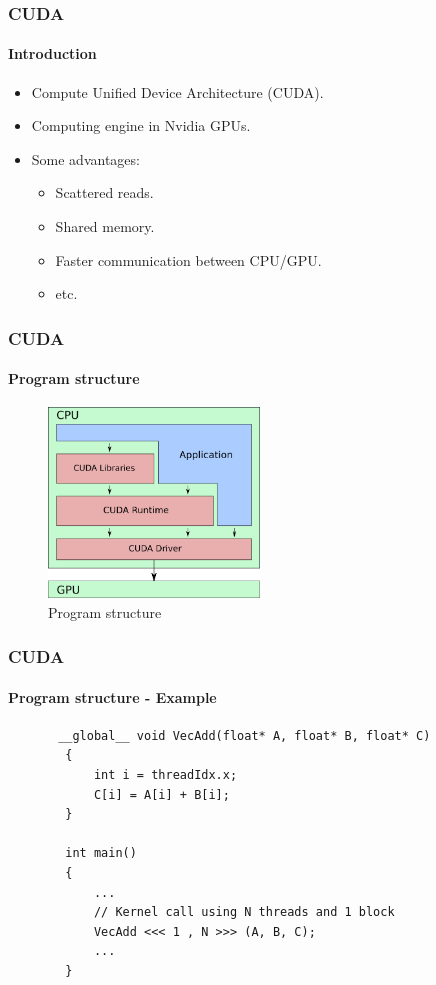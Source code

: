\begin{frame}
    \frametitle{CUDA}
    \framesubtitle{Introduction}
    \begin{itemize}
        \item Compute Unified Device Architecture (CUDA).
        \item Computing engine in Nvidia GPUs.
        \item Some advantages:
        \begin{itemize}
            \item Scattered reads.
            \item Shared memory.
            \item Faster communication between CPU/GPU.
            \item etc.
        \end{itemize}
    \end{itemize}
\end{frame}

\begin{frame}
    \frametitle{CUDA}
    \framesubtitle{Program structure}
    \begin{figure}
        \centering
        \label{fig:cuda-structure}
        \includegraphics[width=0.5\textwidth]{img/cuda-structure}
        \caption{Program structure}
    \end{figure}
\end{frame}

\begin{frame}[fragile]
    \frametitle{CUDA}
    \framesubtitle{Program structure - Example}
    \begin{lstlisting}
       __global__ void VecAdd(float* A, float* B, float* C)
        {
            int i = threadIdx.x;
            C[i] = A[i] + B[i];
        }

        int main()
        {
            ...
            // Kernel call using N threads and 1 block
            VecAdd <<< 1 , N >>> (A, B, C);
            ...
        }
    \end{lstlisting}
\end{frame}



